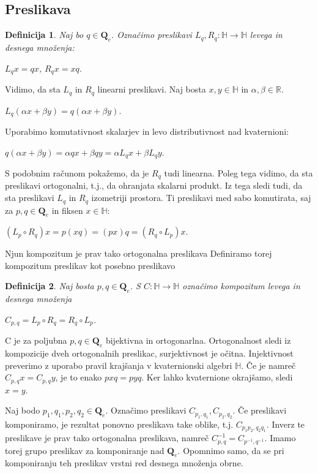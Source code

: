 \documentclass[a4paper,12pt]{article}
\def\R{\mathbb{R}} %
\def\H{\mathbb{H}} %
\def\Qe{\textbf{Q}_{e}} %
\newtheorem{definicija}{Definicija}
\begin{document}
\subsection{Preslikava}
\begin{definicija}
Naj bo $q \in \Qe$. Označimo preslikavi $L_{q}, R_{q} : \H \to \H$ levega in desnega množenja:
\begin{center}
   $L_{q}x = qx$, $R_{q}x = xq$.
\end{center}
\end{definicija}

Vidimo, da sta $L_{q}$ in $R_{q}$ linearni preslikavi. Naj bosta $x,y \in \H$ in $\alpha, \beta \in \R$.
\begin{center}
   $L_{q}(\alpha x +\beta y) = q(\alpha x +\beta y)$.
\end{center}
Uporabimo komutativnost skalarjev in levo distributivnost nad kvaternioni:
\begin{center}
   $q(\alpha x +\beta y) = \alpha qx + \beta qy = \alpha L_{q}x + \beta L_{q}y$.
\end{center}
S podobnim računom pokažemo, da je $R_{q}$ tudi linearna. Poleg tega vidimo, da sta preslikavi ortogonalni,
t.j., da ohranjata skalarni produkt. Iz tega sledi tudi, da sta preslikavi $L_{q}$ in $R_{q}$ izometriji prostora.
Ti preslikavi med sabo komutirata, saj za $p,q \in \Qe$ in fiksen $x \in \H$:
\begin{center}
   $(L_{p} \circ R_{q})x = p(xq) = (px)q = (R_{q} \circ L_{p})x$.
\end{center}
Njun kompozitum je prav tako ortogonalna preslikava
Definiramo torej kompozitum preslikav kot posebno preslikavo
\begin{definicija}
Naj bosta $p,q \in \Qe$. S $C: \H \to \H$ označimo kompozitum levega in desnega množenja
\begin{center}
   $C_{p,q} = L_{p} \circ R_{q} = R_{q} \circ L_{p}$.
\end{center}
\end{definicija}
C je za poljubna $p,q \in \Qe$ bijektivna in ortogonarlna. Ortogonalnost sledi iz kompozicije dveh ortogonalnih preslikac,
surjektivnost je očitna. Injektivnost preverimo z uporabo pravil krajšanja v kvaternionski algebri $\H$.
Če je namreč $C_{p,q}x = C_{p,q}y$, je to enako $pxq = pyq$. Ker lahko kvaternione okrajšamo, sledi $x = y$.

Naj bodo $p_1, q_1, p_2, q_2 \in \Qe$. Označimo preslikavi $C_{p_1, q_1}, C_{p_2,q_2}$. Če preslikavi komponiramo, je rezultat ponovno preslikava take oblike, t.j.
$C_{p_1 p_2, q_2 q_1}$. Inverz te preslikave je prav tako ortogonalna preslikava, namreč $C^{-1}_{p,q} = C_{p^{-1}, q^{-1}}.$ 
Imamo torej grupo preslikav za komponiranje nad $\Qe$.
Opomnimo samo, da se pri komponiranju teh preslikav vrstni red desnega množenja obrne.
\end{document}
